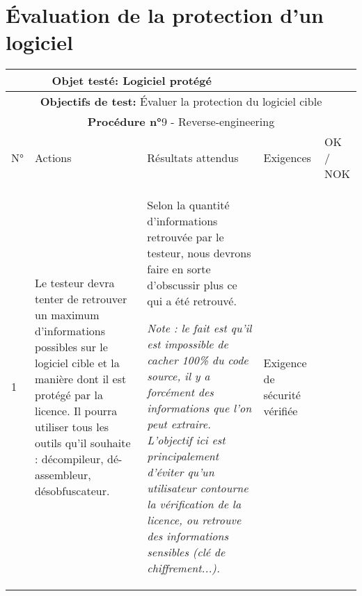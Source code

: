 \section*{Évaluation de la protection d'un logiciel}
\begin{table}[!h]
        \centering
        \begin{tabular}{|m{0.6cm}|
                         >{\raggedright\arraybackslash}m{4cm}|
                         >{\raggedright\arraybackslash}m{6.4cm}|
                         >{\raggedright\arraybackslash}m{2cm}|
                         m{1cm}|}
            \hline
            \multicolumn{3}{|c|}{
                \textbf{Objet testé: } Logiciel protégé
            } & \multicolumn{2}{|c|}{
                \textbf{Version: } version
            } \\
            \hline
            \multicolumn{5}{|c|}{\textbf{Objectifs de test:} 
                Évaluer la protection du logiciel cible} \\
            \hline
            \multicolumn{5}{|c|}{
                \textbf{Procédure n°}9 - Reverse-engineering
            } \\
            \hline
            N° & Actions & Résultats attendus & Exigences & OK / NOK \\
            \hline      %
            1 & Le testeur devra tenter de retrouver un maximum d'informations
                possibles sur le logiciel cible et la manière dont il est
                protégé par la licence. Il pourra utiliser tous les outils
                qu'il souhaite : décompileur, dé-assembleur, désobfuscateur.
              & Selon la quantité d'informations retrouvée par le testeur,
                nous devrons faire en sorte d'obscussir plus ce qui a été
                retrouvé.\newline

                \emph{Note : le fait est qu'il est impossible de cacher
                100\% du code source, il y a forcément des informations
                que l'on peut extraire. L'objectif ici est principalement
                d'éviter qu'un utilisateur contourne la vérification de
                la licence, ou retrouve des informations sensibles (clé
                de chiffrement...).}
              & Exigence de sécurité vérifiée & \\
            \hline
        \end{tabular} 
        \label{tab:tab6}
\end{table}
\newpage

